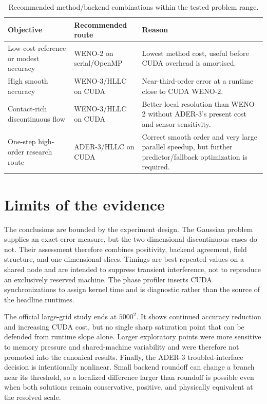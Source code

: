 \begin{table}[H]
\centering
\small
\renewcommand{\arraystretch}{1.30}
\begin{tabular}{p{}p{}p{}}
\toprule
Objective & Recommended route & Reason \tabularnewline
\midrule
Low-cost reference or modest accuracy & WENO-2 on serial/OpenMP & Lowest method cost, useful before CUDA overhead is amortised. \tabularnewline
High smooth accuracy & WENO-3/HLLC on CUDA & Near-third-order error at a runtime close to CUDA WENO-2. \tabularnewline
Contact-rich discontinuous flow & WENO-3/HLLC on CUDA & Better local resolution than WENO-2 without ADER-3's present cost and sensor sensitivity. \tabularnewline
One-step high-order research route & ADER-3/HLLC on CUDA & Correct smooth order and very large parallel speedup, but further predictor/fallback optimization is required. \tabularnewline
\bottomrule
\end{tabular}
\caption{Recommended method/backend combinations within the tested problem range.}
\label{tab:recommendations}
\end{table}

\section{Limits of the evidence}

The conclusions are bounded by the experiment design.  The Gaussian problem supplies an
exact error measure, but the two-dimensional discontinuous cases do not. Their assessment
therefore combines positivity, backend agreement, field structure, and one-dimensional
slices.  Timings are best repeated values on a shared node and are intended to suppress
transient interference, not to reproduce an exclusively reserved machine.  The phase
profiler inserts CUDA synchronizations to assign kernel time and is diagnostic rather than
the source of the headline runtimes.

The official large-grid study ends at \(5000^2\).  It shows continued accuracy reduction
and increasing CUDA cost, but no single sharp saturation point that can be defended from
runtime slope alone.  Larger exploratory points were more sensitive to memory pressure and
shared-machine variability and were therefore not promoted into the canonical results.
Finally, the ADER-3 troubled-interface decision is intentionally nonlinear.  Small backend
roundoff can change a branch near its threshold, so a localized difference larger than
roundoff is possible even when both solutions remain conservative, positive, and physically
equivalent at the resolved scale.
